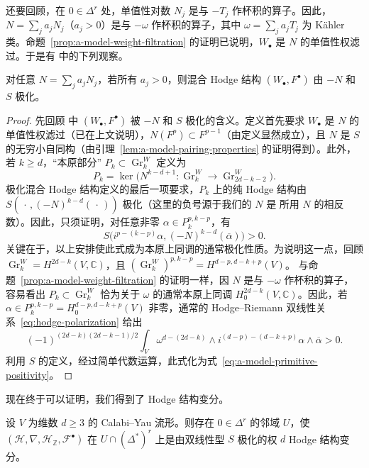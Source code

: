 还要回顾，在 $0\in\Delta^r$ 处，单值性对数 $N_j$ 是与 $-T_j$ 作杯积的算子。因此，$N=\sum_ja_jN_j$（$a_j>0$）是与 $-\omega$ 作杯积的算子，其中 $\omega=\sum_ja_jT_j$ 为 Kähler 类。命题~\ref{prop:a-model-weight-filtration} 的证明已说明，$W_\bullet$ 是 $N$ 的单值性权滤过。于是有  中的下列观察。
\begin{proposition}\label{prop:a-model-polarized-mixed-hodge}
对任意 $N=\sum_ja_jN_j$，若所有 $a_j>0$，则混合 Hodge 结构 $(W_\bullet,F^\bullet)$ 由 $-N$ 和 $S$ 极化。
\end{proposition}
\begin{proof}
先回顾  中 $(W_\bullet,F^\bullet)$ 被 $-N$ 和 $S$ 极化的含义。定义首先要求 $W_\bullet$ 是 $N$ 的单值性权滤过（已在上文说明），$N(F^p)\subset F^{p-1}$（由定义显然成立），且 $N$ 是 $S$ 的无穷小自同构（由引理~\ref{lem:a-model-pairing-properties} 的证明得到）。此外，若 $k\ge d$，“本原部分” $P_k\subset\operatorname{Gr}^W_k$ 定义为
\[
P_k=\ker\bigl(N^{k-d+1}:\operatorname{Gr}^W_k\longrightarrow\operatorname{Gr}^W_{2d-k-2}\bigr).
\]
极化混合 Hodge 结构定义的最后一项要求，$P_k$ 上的纯 Hodge 结构由 $S(\,\cdot\,,(-N)^{k-d}(\,\cdot\,))$ 极化（这里的负号源于我们的 $N$ 是  所用 $N$ 的相反数）。因此，只须证明，对任意非零 $\alpha\in P_k^{p,k-p}$，有
\begin{equation}\label{eq:a-model-primitive-positivity}
S\bigl(i^{p-(k-p)}\alpha,(-N)^{k-d}(\overline\alpha)\bigr)>0.
\end{equation}
关键在于，以上安排使此式成为本原上同调的通常极化性质。为说明这一点，回顾 $\operatorname{Gr}^W_k=H^{2d-k}(V,\mathbb C)$，且 $(\operatorname{Gr}^W_k)^{p,k-p}=H^{d-p,d-k+p}(V)$。
与命题~\ref{prop:a-model-weight-filtration} 的证明一样，因 $N$ 是与 $-\omega$ 作杯积的算子，容易看出 $P_k\subset\operatorname{Gr}^W_k$ 恰为关于 $\omega$ 的通常本原上同调 $H^{2d-k}_0(V,\mathbb C)$。因此，若 $\alpha\in P_k^{p,k-p}=H^{d-p,d-k+p}_0(V)$ 非零，通常的 Hodge--Riemann 双线性关系~\eqref{eq:hodge-polarization} 给出
\[
(-1)^{(2d-k)(2d-k-1)/2}\int_V\omega^{d-(2d-k)}\wedge i^{(d-p)-(d-k+p)}\alpha\wedge\overline\alpha>0.
\]
利用 $S$ 的定义，经过简单代数运算，此式化为式~\eqref{eq:a-model-primitive-positivity}。
\end{proof}
现在终于可以证明，我们得到了 Hodge 结构变分。
\begin{theorem}\label{thm:a-model-hodge-variation}
设 $V$ 为维数 $d\ge3$ 的 Calabi--Yau 流形。则存在 $0\in\Delta^r$ 的邻域 $U$，使 $(\mathcal H,\nabla,\mathcal H_{\mathbb Z},\mathcal F^\bullet)$ 在 $U\cap(\Delta^*)^r$ 上是由双线性型 $S$ 极化的权 $d$ Hodge 结构变分。
\end{theorem}
